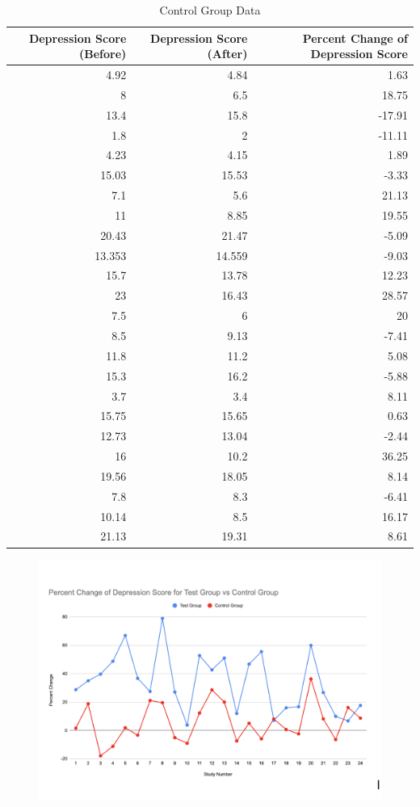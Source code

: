 \documentclass[12pt]{article}
\begin{document}
  
  \begin{table}[h!]
    \small
    \caption{Control Group Data}
    \label{tab:2}
  \centering
  \begin{tabular}{rrr}
      \toprule
  Depression Score (Before) & Depression Score (After) & Percent Change of Depression Score \\ 
    \midrule
     4.92 & 4.84 & 1.63\\ 
     8 & 6.5 & 18.75\\ 
     13.4 & 15.8 & -17.91\\ 
     1.8 & 2 & -11.11\\ 
     4.23 & 4.15 & 1.89\\ 
     15.03 & 15.53 & -3.33\\  
     7.1 & 5.6 & 21.13\\
     11 & 8.85 & 19.55\\
     20.43 & 21.47 & -5.09\\
     13.353 & 14.559 & -9.03\\
     15.7 & 13.78 & 12.23\\
     23 & 16.43 & 28.57\\
     7.5 & 6 & 20\\
     8.5 & 9.13 & -7.41\\
     11.8 & 11.2 & 5.08\\
     15.3 & 16.2 & -5.88\\
     3.7 & 3.4 & 8.11\\
     15.75 & 15.65 & 0.63\\
     12.73 & 13.04 & -2.44\\
     16 & 10.2 & 36.25\\
     19.56 & 18.05 & 8.14\\
     7.8 & 8.3 & -6.41\\
     10.14 & 8.5 & 16.17\\
     21.13 & 19.31 & 8.61\\
     \bottomrule
  \end{tabular}
  \end{table}

  \begin{figure}[h!]
    \centering
    \includegraphics[width=12 cm]{CHART1.png}
    \label{fig:chart1}
  \end{figure}
\end{document}
